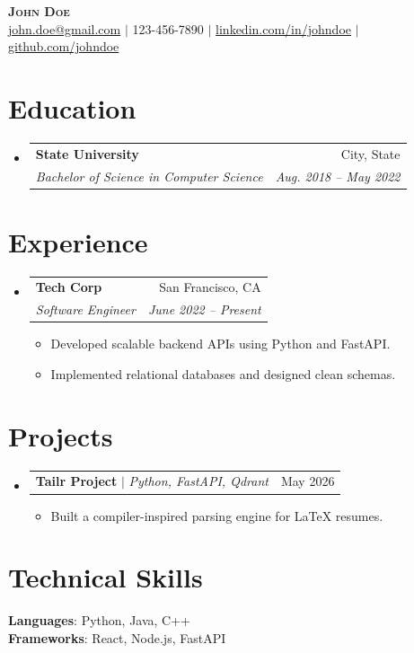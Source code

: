 \documentclass[letterpaper,11pt]{article}
\makeatletter
\newcommand{\resumeItem}[1]{
  \item\small{
    {#1 \vspace{-2pt}}
  }
}
\newcommand{\resumeSubheading}[4]{
  \vspace{-2pt}\item
    \begin{tabular*}{0.97\textwidth}[t]{l@{\extracolsep{\fill}}r}
      \textbf{#1} & #2 \\
      \textit{\small#3} & \textit{\small #4} \\
    \end{tabular*}\vspace{-7pt}
}
\newcommand{\resumeProjectHeading}[2]{
    \item
    \begin{tabular*}{0.97\textwidth}{l@{\extracolsep{\fill}}r}
      #1 & #2 \\
    \end{tabular*}\vspace{-7pt}
}
\newcommand{\resumeSubHeadingListStart}{\begin{itemize}[leftmargin=0.15in, label={}]}
\newcommand{\resumeSubHeadingListEnd}{\end{itemize}}
\newcommand{\resumeItemListStart}{\begin{itemize}}
\newcommand{\resumeItemListEnd}{\end{itemize}\vspace{-5pt}}
\makeatother
\begin{document}
\begin{center}
    \textbf{\Huge \scshape John Doe} \\ \small
    \href{mailto:john.doe@gmail.com}{john.doe@gmail.com} $|$ 
    123-456-7890 $|$ 
    \href{https://linkedin.com/in/johndoe}{linkedin.com/in/johndoe} $|$
    \href{https://github.com/johndoe}{github.com/johndoe}
\end{center}

\section{Education}
  \resumeSubHeadingListStart
    \resumeSubheading
      {State University}{City, State}
      {Bachelor of Science in Computer Science}{Aug. 2018 -- May 2022}
  \resumeSubHeadingListEnd

\section{Experience}
  \resumeSubHeadingListStart
    \resumeSubheading
      {Tech Corp}{San Francisco, CA}
      {Software Engineer}{June 2022 -- Present}
      \resumeItemListStart
        \resumeItem{Developed scalable backend APIs using Python and FastAPI.}
        \resumeItem{Implemented relational databases and designed clean schemas.}
      \resumeItemListEnd
  \resumeSubHeadingListEnd

\section{Projects}
    \resumeSubHeadingListStart
      \resumeProjectHeading
          {\textbf{Tailr Project} $|$ \emph{Python, FastAPI, Qdrant}}{May 2026}
          \resumeItemListStart
            \resumeItem{Built a compiler-inspired parsing engine for LaTeX resumes.}
          \resumeItemListEnd
    \resumeSubHeadingListEnd

\section{Technical Skills}
 \begin{itemize}[leftmargin=0.15in, label={}]
    \small{\item{
     \textbf{Languages}{: Python, Java, C++} \\
     \textbf{Frameworks}{: React, Node.js, FastAPI}
    }}
 \end{itemize}
\end{document}
